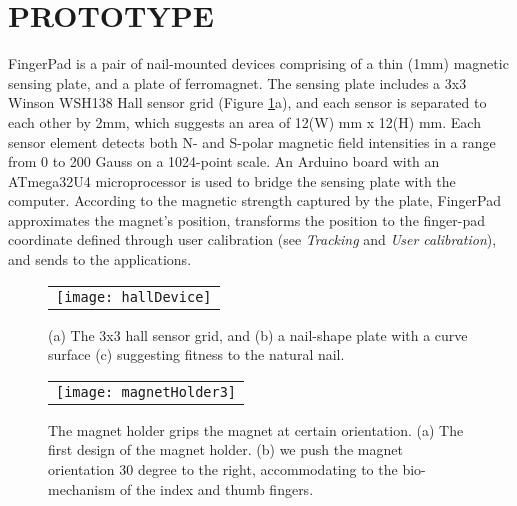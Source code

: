 
\section{PROTOTYPE}
FingerPad is a pair of nail-mounted devices comprising of a thin (1mm) magnetic sensing plate, and a plate of ferromagnet. 
The sensing plate includes a 3x3 Winson WSH138 Hall sensor grid (Figure \ref{fig:hallDevice}a), and each sensor is separated to each other by 2mm, which suggests an area of 12(W) mm x 12(H) mm. 
Each sensor element detects both N- and S-polar magnetic field intensities in a range from 0 to 200 Gauss on a 1024-point scale. 
An Arduino board with an ATmega32U4 microprocessor is used to bridge the sensing plate with the computer.
According to the magnetic strength captured by the plate, FingerPad approximates the magnet's position, transforms the position to the finger-pad coordinate defined through user calibration (see  \emph{Tracking} and  \emph{User calibration}), and sends to the applications. 

\begin{figure}
\begin{center}
  \begin{tabular}{@{\hspace{0.1cm}}c}
		\texttt{[image: hallDevice]}
   \end{tabular}
\caption{(a) The 3x3 hall sensor grid, and (b) a nail-shape plate with a curve surface (c) suggesting fitness to the natural nail. }
\label{fig:hallDevice}
\end{center}
\end{figure}

\begin{figure}
\begin{center}
  \begin{tabular}{@{\hspace{0.1cm}}c}
		\texttt{[image: magnetHolder3]}
   \end{tabular}
\caption{The magnet holder grips the magnet at certain orientation. 
(a) The first design of the magnet holder. (b) we push the magnet orientation 30 degree to the right, accommodating to the bio-mechanism of the index and thumb fingers.}
\label{fig:magnetHolder}
\end{center}
\end{figure}

